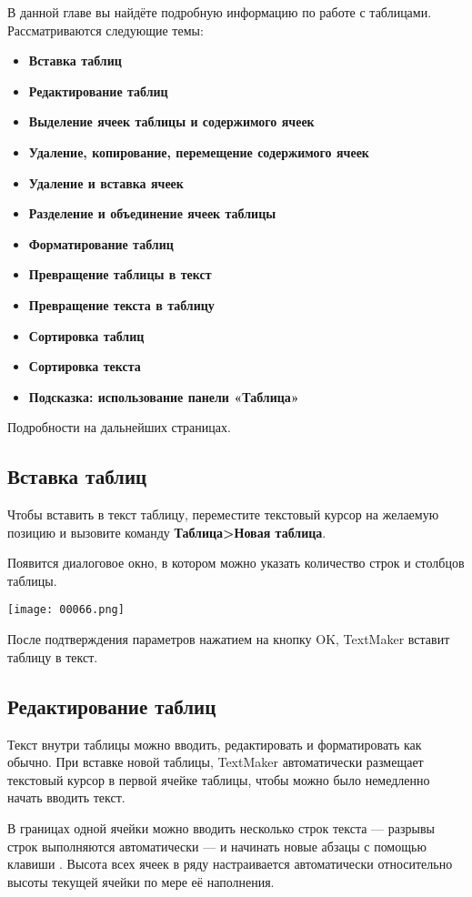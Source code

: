 \documentclass[a4paper,10pt]{article}
\begin{document}
В данной главе вы найдёте подробную информацию по работе с таблицами. Рассматриваются следующие темы:

\begin{itemize}
 \item \textbf{Вставка таблиц}
 \item \textbf{Редактирование таблиц}
 \item \textbf{Выделение ячеек таблицы и содержимого ячеек}
 \item \textbf{Удаление, копирование, перемещение содержимого ячеек}
 \item \textbf{Удаление и вставка ячеек}
 \item \textbf{Разделение и объединение ячеек таблицы}
 \item \textbf{Форматирование таблиц}
 \item \textbf{Превращение таблицы в текст}
 \item \textbf{Превращение текста в таблицу}
 \item \textbf{Сортировка таблиц}
 \item \textbf{Сортировка текста}
 \item \textbf{Подсказка: использование панели «Таблица»}
\end{itemize}
 Подробности на дальнейших страницах.
 
\subsection{Вставка таблиц}
Чтобы вставить в текст таблицу, переместите текстовый курсор на желаемую позицию и вызовите команду \textbf{Таблица>Новая таблица}.

Появится диалоговое окно, в котором можно указать количество строк и столбцов таблицы.

\texttt{[image: 00066.png]}

После подтверждения параметров нажатием на кнопку OK, TextMaker вставит таблицу в текст. 

\subsection{Редактирование таблиц}
Текст внутри таблицы можно вводить, редактировать и форматировать как обычно. При вставке новой таблицы, TextMaker автоматически размещает текстовый курсор в первой ячейке таблицы, чтобы можно было немедленно начать вводить текст.

В границах одной ячейки можно вводить несколько строк текста --- разрывы строк выполняются автоматически --- и начинать новые абзацы с помощью клавиши . Высота всех ячеек в ряду настраивается автоматически относительно высоты текущей ячейки по мере её наполнения.
\end{document}
